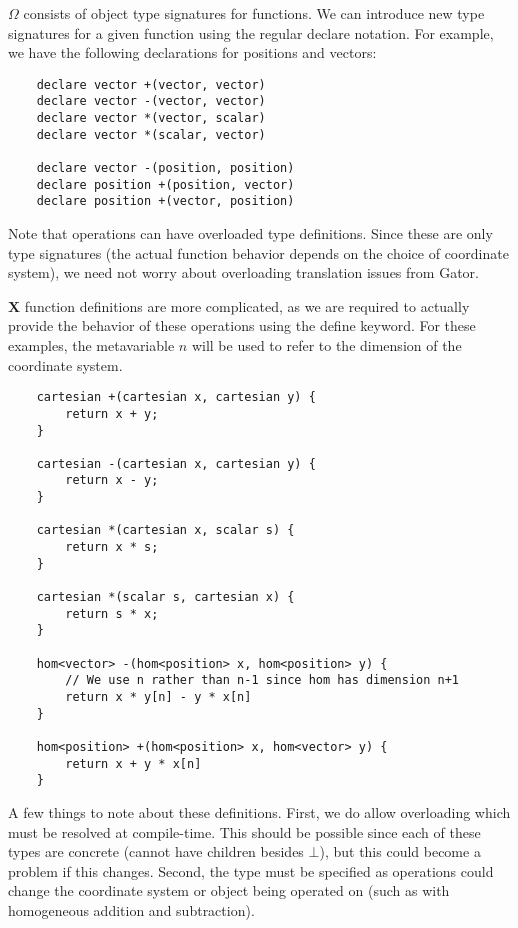 \documentclass{article}
\newcommand{\Chi}{\mathbf{X}}
\begin{document}
$\Omega$ consists of object type signatures for functions.  We can introduce new type signatures for a given function using the regular \textsf{declare} notation.  For example, we have the following declarations for \textsf{positions} and \textsf{vectors}:

\begin{lstlisting}
	declare vector +(vector, vector)
	declare vector -(vector, vector)
	declare vector *(vector, scalar)
	declare vector *(scalar, vector)
	
	declare vector -(position, position)
	declare position +(position, vector)
	declare position +(vector, position)
\end{lstlisting}

Note that operations can have overloaded type definitions.  Since these are only type signatures (the actual function behavior depends on the choice of coordinate system), we need not worry about overloading translation issues from Gator.

$\Chi$ function definitions are more complicated, as we are required to actually provide the behavior of these operations using the \textsf{define} keyword.  For these examples, the metavariable $n$ will be used to refer to the dimension of the coordinate system.

\begin{lstlisting}
	cartesian +(cartesian x, cartesian y) {
		return x + y;
	}
	
	cartesian -(cartesian x, cartesian y) {
		return x - y;
	}
	
	cartesian *(cartesian x, scalar s) {
		return x * s;
	}

	cartesian *(scalar s, cartesian x) {
		return s * x;
	}
	
	hom<vector> -(hom<position> x, hom<position> y) {
		// We use n rather than n-1 since hom has dimension n+1
		return x * y[n] - y * x[n]
	}
	
	hom<position> +(hom<position> x, hom<vector> y) {
		return x + y * x[n]
	}
\end{lstlisting}

A few things to note about these definitions.  First, we do allow overloading which must be resolved at compile-time.  This should be possible since each of these types are concrete (cannot have children besides $\bot$), but this could become a problem if this changes.  Second, the type must be specified as operations could change the coordinate system or object being operated on (such as with homogeneous addition and subtraction).
\end{document}
